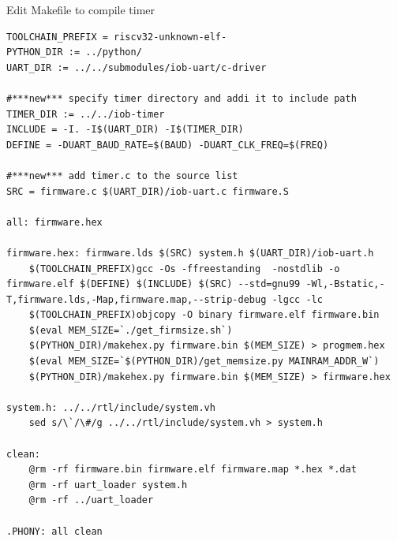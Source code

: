 \documentclass [xcolor=svgnames, t] {beamer}
\begin{document}
\begin{frame}[fragile]{Edit Makefile to compile timer}
\begin{tiny}
\begin{lstlisting}
TOOLCHAIN_PREFIX = riscv32-unknown-elf-
PYTHON_DIR := ../python/
UART_DIR := ../../submodules/iob-uart/c-driver

#***new*** specify timer directory and addi it to include path 
TIMER_DIR := ../../iob-timer
INCLUDE = -I. -I$(UART_DIR) -I$(TIMER_DIR)
DEFINE = -DUART_BAUD_RATE=$(BAUD) -DUART_CLK_FREQ=$(FREQ)

#***new*** add timer.c to the source list
SRC = firmware.c $(UART_DIR)/iob-uart.c firmware.S

all: firmware.hex

firmware.hex: firmware.lds $(SRC) system.h $(UART_DIR)/iob-uart.h
	$(TOOLCHAIN_PREFIX)gcc -Os -ffreestanding  -nostdlib -o firmware.elf $(DEFINE) $(INCLUDE) $(SRC) --std=gnu99 -Wl,-Bstatic,-T,firmware.lds,-Map,firmware.map,--strip-debug -lgcc -lc
	$(TOOLCHAIN_PREFIX)objcopy -O binary firmware.elf firmware.bin
	$(eval MEM_SIZE=`./get_firmsize.sh`)
	$(PYTHON_DIR)/makehex.py firmware.bin $(MEM_SIZE) > progmem.hex
	$(eval MEM_SIZE=`$(PYTHON_DIR)/get_memsize.py MAINRAM_ADDR_W`)
	$(PYTHON_DIR)/makehex.py firmware.bin $(MEM_SIZE) > firmware.hex

system.h: ../../rtl/include/system.vh
	sed s/\`/\#/g ../../rtl/include/system.vh > system.h

clean:
	@rm -rf firmware.bin firmware.elf firmware.map *.hex *.dat
	@rm -rf uart_loader system.h
	@rm -rf ../uart_loader

.PHONY: all clean
\end{lstlisting}
\end{tiny}
\end{frame}
\end{document}
